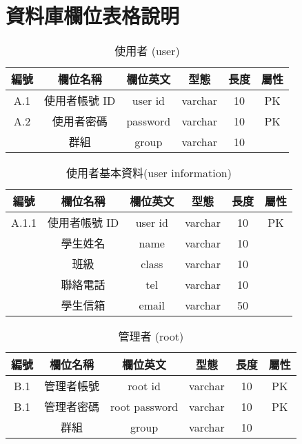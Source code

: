   \section{資料庫欄位表格說明}

\begin{table}[H]
\caption{使用者 (user)}
\label{tab:使用者}
\renewcommand{\arraystretch}{1} %
\arrayrulewidth=0.5pt               %
\centering
\begin{tabular}[t]{|c|c|c|c|c|c|}  %
\hline
編號 & 欄位名稱 & 欄位英文 & 型態 & 長度 & 屬性 \\
\hline
A.1 & 使用者帳號 ID & user id & varchar & 10 & PK \\
\hline
A.2 & 使用者密碼 & password & varchar & 10 & PK \\
\hline
& 群組 & group & varchar & 10 &  \\
\hline
\end{tabular}
\end{table}

\begin{table}[H]
\caption{使用者基本資料(user information)}
\label{tab:使用者基本資料}
\renewcommand{\arraystretch}{0.9} %
\arrayrulewidth=0.5pt               %
\centering
\begin{tabular}[t]{|c|c|c|c|c|c|}  %
\hline
編號 & 欄位名稱 & 欄位英文 & 型態 & 長度 & 屬性 \\
\hline
A.1.1 & 使用者帳號 ID & user id & varchar & 10 & PK \\
\hline
& 學生姓名 & name & varchar & 10 & \\
\hline
& 班級 & class & varchar & 10 & \\
\hline
& 聯絡電話 & tel & varchar & 10 & \\
\hline
& 學生信箱 & email & varchar & 50 & \\
\hline
\end{tabular}
\end{table}

\begin{table}[H]
\caption{管理者 (root)}
\label{tab:管理者}
\renewcommand{\arraystretch}{1} %
\arrayrulewidth=0.5pt               %
\centering
\begin{tabular}[t]{|c|c|c|c|c|c|}  %
\hline
編號 & 欄位名稱 & 欄位英文 & 型態 & 長度 & 屬性 \\
\hline
B.1 & 管理者帳號 & root id & varchar & 10 & PK \\
\hline
B.1 & 管理者密碼 & root password & varchar & 10 & PK \\
\hline
& 群組 & group & varchar & 10 & \\
\hline
\end{tabular}
\end{table}

